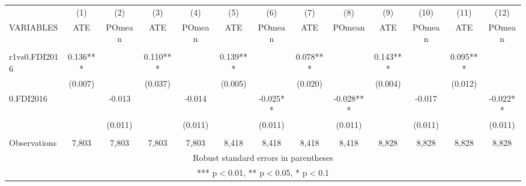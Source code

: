 \documentclass[]{article}
\begin{document}
\begin{tabular}{lcccccccccccc} \hline
 & (1) & (2) & (3) & (4) & (5) & (6) & (7) & (8) & (9) & (10) & (11) & (12) \\
VARIABLES & ATE & POmean & ATE & POmean & ATE & POmean & ATE & POmean & ATE & POmean & ATE & POmean \\ \hline
 &  &  &  &  &  &  &  &  &  &  &  &  \\
r1vs0.FDI2016 & 0.136*** &  & 0.110*** &  & 0.139*** &  & 0.078*** &  & 0.143*** &  & 0.095*** &  \\
 & (0.007) &  & (0.037) &  & (0.005) &  & (0.020) &  & (0.004) &  & (0.012) &  \\
0.FDI2016 &  & -0.013 &  & -0.014 &  & -0.025** &  & -0.028*** &  & -0.017 &  & -0.022** \\
 &  & (0.011) &  & (0.011) &  & (0.011) &  & (0.011) &  & (0.011) &  & (0.011) \\
 &  &  &  &  &  &  &  &  &  &  &  &  \\
 Observations & 7,803 & 7,803 & 7,803 & 7,803 & 8,418 & 8,418 & 8,418 & 8,418 & 8,828 & 8,828 & 8,828 & 8,828 \\ \hline
\multicolumn{13}{c}{ Robust standard errors in parentheses} \\
\multicolumn{13}{c}{ *** p$<$0.01, ** p$<$0.05, * p$<$0.1} \\
\end{tabular}
\end{document}
